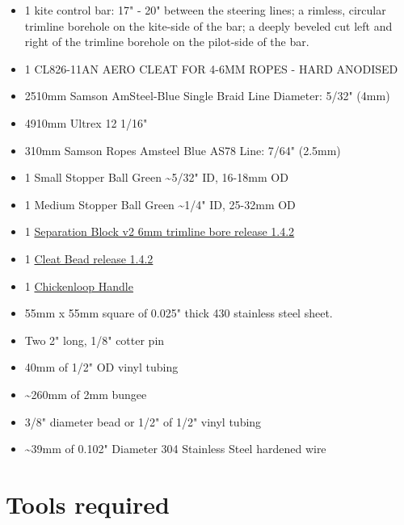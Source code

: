 \documentclass[
]{book}
\providecommand{\tightlist}{%
  \setlength{\itemsep}{0pt}\setlength{\parskip}{0pt}}
\begin{document}
\begin{itemize}
\tightlist
\item
  1 kite control bar: 17" - 20" between the steering lines; a rimless, circular trimline borehole on the kite-side of the bar; a deeply beveled cut left and right of the trimline borehole on the pilot-side of the bar.
\item
  1 CL826-11AN AERO CLEAT FOR 4-6MM ROPES - HARD ANODISED
\item
  2510mm Samson AmSteel-Blue Single Braid Line Diameter: 5/32" (4mm)
\item
  4910mm Ultrex 12 1/16"
\item
  310mm Samson Ropes Amsteel Blue AS78 Line: 7/64" (2.5mm)
\item
  1 Small Stopper Ball Green \textasciitilde5/32" ID, 16-18mm OD
\item
  1 Medium Stopper Ball Green \textasciitilde1/4" ID, 25-32mm OD
\item
  1 \href{https://github.com/pbchase/kite_bar_parts/blob/master/printable/separation_block_v2_6mm_trimline_bore_7e61bdd.stl}{Separation Block v2 6mm trimline bore release 1.4.2}
\item
  1 \href{https://github.com/pbchase/kite_bar_parts/blob/1.4.2/printable/cleat_bead_ff7e41a.stl}{Cleat Bead release 1.4.2}
\item
  1 \href{https://github.com/pbchase/kite_bar_parts/blob/master/printable/chickenloop_release_d1928a2.stl}{Chickenloop Handle}
\item
  55mm x 55mm square of 0.025" thick 430 stainless steel sheet.
\item
  Two 2" long, 1/8" cotter pin
\item
  40mm of 1/2" OD vinyl tubing
\item
  \textasciitilde260mm of 2mm bungee
\item
  3/8" diameter bead or 1/2" of 1/2" vinyl tubing
\item
  \textasciitilde39mm of 0.102" Diameter 304 Stainless Steel hardened wire
\end{itemize}

\hypertarget{tools-required}{%
\section{Tools required}\label{tools-required}}
\end{document}
